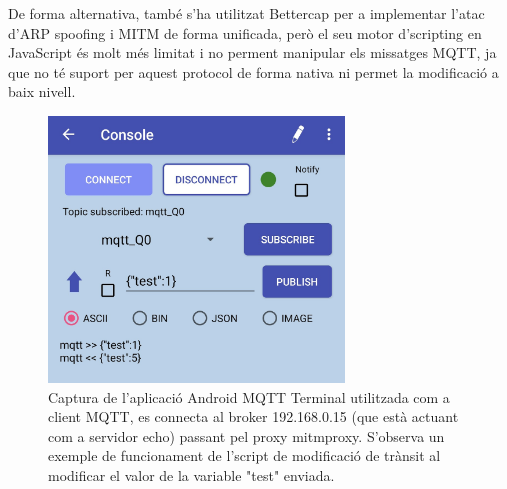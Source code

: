   De forma alternativa, també s'ha utilitzat Bettercap per a implementar l'atac d'ARP spoofing i MITM de forma unificada, però el seu motor d'scripting en JavaScript és molt més limitat i no perment manipular els missatges MQTT, ja que no té suport per aquest protocol de forma nativa ni permet la modificació a baix nivell.

    \begin{figure}[H]
    \centering
    \includegraphics[width=0.7\textwidth]{img/captmqttclient.jpg}
    \caption{Captura de l'aplicació Android MQTT Terminal utilitzada com a client MQTT, es connecta al broker 192.168.0.15 (que està actuant com a servidor echo) passant pel proxy mitmproxy. S'observa un exemple de funcionament de l'script de modificació de trànsit al modificar el valor de la variable "test" enviada.}
    \label{fig:MqttClientCapt}
  \end{figure}